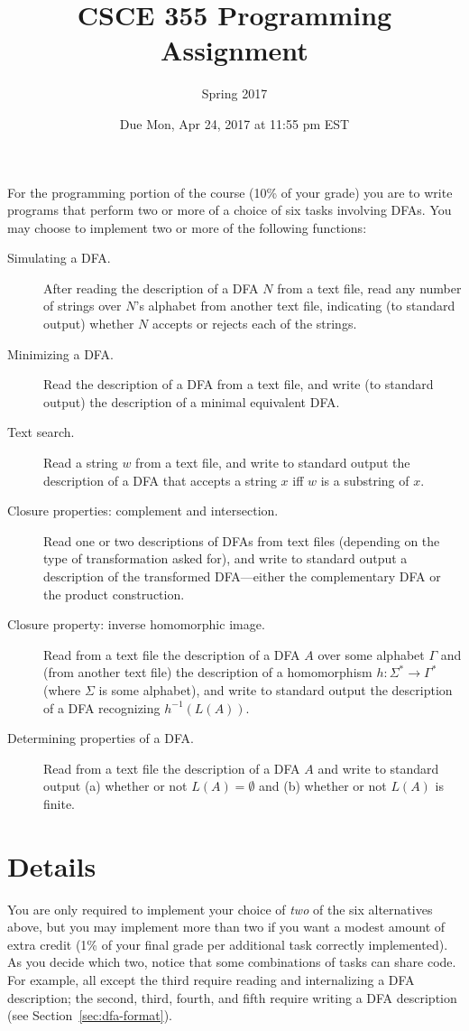 \documentclass[11pt]{article}
\title{
  CSCE 355 Programming Assignment
}
\author{Spring 2017}
\date{Due Mon, Apr 24, 2017 at 11:55 pm EST}
\begin{document}
\maketitle

For the programming portion of the course (10\% of your grade) you are
to write programs that perform two or more of a choice of six tasks
involving DFAs.  You may choose to implement two or more of the
following functions:
\begin{description}
  \item[Simulating a DFA\@.]
    After reading the description of a DFA $N$ from a text file, read
    any number of strings over $N$'s alphabet from another text file,
    indicating (to standard output) whether $N$ accepts or rejects
    each of the strings.
  \item[Minimizing a DFA\@.]
    Read the description of a DFA from a text file, and write (to
    standard output) the description of a minimal equivalent DFA\@.
  \item[Text search.]
    Read a string $w$ from a text file, and write to standard output
    the description of a DFA that accepts a string $x$ iff $w$ is a
    substring of $x$.
  \item[Closure properties: complement and intersection.]
    Read one or two descriptions of DFAs from text files (depending on
    the type of transformation asked for), and write to standard
    output a description of the transformed DFA---either the
    complementary DFA or the product construction.
  \item[Closure property: inverse homomorphic image.]
    Read from a text file the description of a DFA $A$ over some
    alphabet $\Gamma$ and (from another text file) the description of
    a homomorphism $h:\Sigma^*\rightarrow\Gamma^*$ (where $\Sigma$ is
    some alphabet), and write to standard output the description of a
    DFA recognizing $h^{-1}(L(A))$.
  \item[Determining properties of a DFA\@.]
    Read from a text file the description of a DFA $A$ and write to
    standard output (a) whether or not $L(A) = \emptyset$ and (b)
    whether or not $L(A)$ is finite.
\end{description}

\section{Details}

You are only required to implement your choice of \emph{two} of the
six alternatives above, but you may implement more than two if you
want a modest amount of extra credit (1\% of your final grade per
additional task correctly implemented).  As you decide which two,
notice that some combinations of tasks can share code.  For example,
all except the third require reading and internalizing a DFA
description; the second, third, fourth, and fifth require writing a
DFA description (see Section~\ref{sec:dfa-format}).
\end{document}
